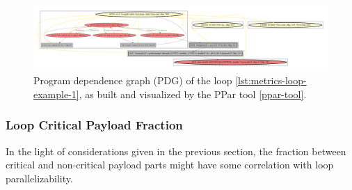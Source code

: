 \begin{figure}[htb]
	\centering
	\includegraphics[width=\linewidth]{figs/metrics-example-loop-1-pdg.pdf}
	\caption{Program dependence graph (PDG) of the loop \ref{lst:metrics-loop-example-1}, as built and visualized by the PPar tool \ref{ppar-tool}.}
	\label{metrics-example-loop-1-pdg}
\end{figure}

\subsubsection{Loop Critical Payload Fraction}
\label{metrics-loop-critical-payload-fraction}
\qquad In the light of considerations given in the previous section, the fraction between critical and non-critical payload parts might have some correlation with loop parallelizability.  

